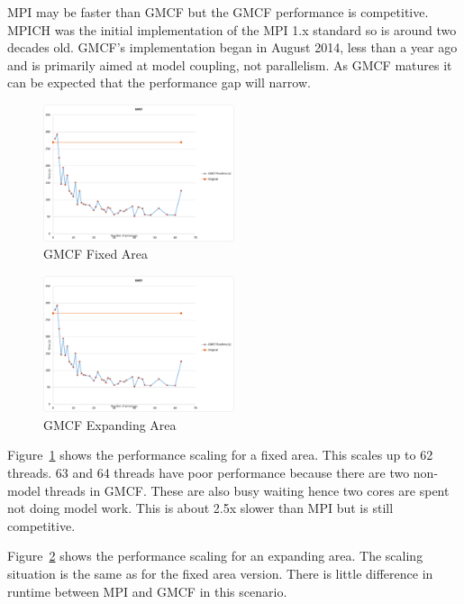 MPI may be faster than GMCF but the GMCF performance is competitive. MPICH was
the initial implementation of the MPI 1.x standard so is around two decades old.
GMCF's implementation began in August 2014, less than a year ago and is
primarily aimed at model coupling, not parallelism. As GMCF matures it can be
expected that the performance gap will narrow.

\begin{figure}
    \includegraphics[page=1,width=0.5\textwidth]
    {graphs/gmcfThreadPinningFasterSorNoREQDATAnewAPISpinBusyWaitFixedArea-crop.pdf}
    \caption{GMCF Fixed Area}
    \label{fig:gmcffixedarea}
\end{figure}

\begin{figure}
    \includegraphics[page=1,width=0.5\textwidth]
    {graphs/gmcfThreadPinningFasterSorNoREQDATAnewAPISpinBusyWaitFixedArea-crop.pdf}
    \caption{GMCF Expanding Area}
    \label{fig:gmcfexpandingarea}
\end{figure}

Figure~\ref{fig:gmcffixedarea} shows the performance scaling for a fixed area.
This scales up to 62 threads. 63 and 64 threads have poor performance because
there are two non-model threads in GMCF. These are also busy waiting hence two
cores are spent not doing model work. This is about 2.5x slower than MPI but is
still competitive.

Figure~\ref{fig:gmcfexpandingarea} shows the performance scaling for an
expanding area. The scaling situation is the same as for the fixed area version.
There is little difference in runtime between MPI and GMCF in this scenario.
